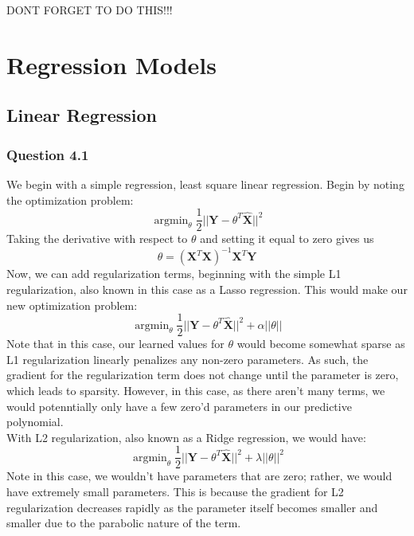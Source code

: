 \documentclass[11pt,letterpaper]{article}
\DeclareMathOperator*{\argmin}{argmin}
\begin{document}
DONT FORGET TO DO THIS!!!

\section*{Regression Models}
\subsection*{Linear Regression}
\subsubsection*{Question 4.1}
We begin with a simple regression, least square linear regression. Begin by 
noting the optimization problem:
\begin{equation}
    \argmin_{\theta} \dfrac{1}{2}||\textbf{Y}-\theta^T\hat{\textbf{X}}||^2
\end{equation}
Taking the derivative with respect to $\theta$ and setting it equal to zero 
gives us 
\begin{equation}
\theta = \left(\textbf{X}^T\textbf{X}\right)^{-1}\textbf{X}^T\textbf{Y}
\end{equation}
Now, we can add regularization terms, beginning with the simple L1 
regularization, also known in this case as a Lasso regression. This would make 
our new optimization problem:
\begin{equation}
    \argmin_{\theta} \dfrac{1}{2}||\textbf{Y}-\theta^T\hat{\textbf{X}}||^2 + 
    \alpha ||\theta||
\end{equation}
Note that in this case, our learned values for $\theta$ would become somewhat 
sparse as L1 regularization linearly penalizes any non-zero parameters.
As such, the gradient for the regularization term does not change until the 
parameter is zero, which leads to sparsity. However, in this case, as there 
aren't many terms, we would potenntially only have a few zero'd parameters in 
our predictive polynomial. \\

With L2 regularization, also known as a Ridge regression, we would have:
\begin{equation}
    \argmin_{\theta} \dfrac{1}{2}||\textbf{Y}-\theta^T\hat{\textbf{X}}||^2 + 
    \lambda ||\theta||^2
\end{equation}
Note in this case, we wouldn't have parameters that are zero; rather, we would 
have extremely small parameters. This is because the gradient for L2 
regularization decreases rapidly as the parameter itself becomes smaller and 
smaller due to the parabolic nature of the term. 



\end{document}
